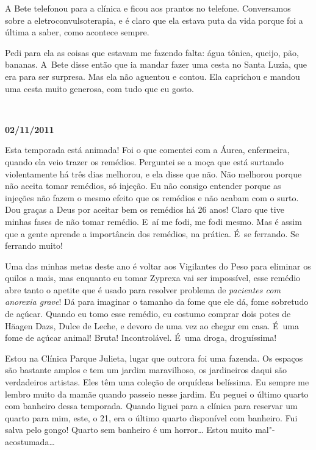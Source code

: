 A Bete telefonou para a clínica e ficou aos prantos no telefone.
Conversamos sobre a eletroconvulsoterapia, e é claro que ela estava puta
da vida porque foi a última a saber, como acontece sempre.

Pedi para ela as coisas que estavam me fazendo falta: água tônica,
queijo, pão, bananas. A~Bete disse então que ia mandar fazer uma
cesta no Santa Luzia, que era para ser surpresa. Mas ela não aguentou e
contou. Ela caprichou e mandou uma cesta muito generosa, com tudo que eu
gosto.

\begin{center}\asterisc{}​\end{center}


\begin{flushright}\textbf{02/11/2011}\end{flushright}


Esta temporada está animada! Foi o que comentei com a Áurea, enfermeira,
quando ela veio trazer os remédios. Perguntei se a moça que está
surtando violentamente há três dias melhorou, e ela disse que não. Não
melhorou porque não aceita tomar remédios, só injeção. Eu não consigo
entender porque as injeções não fazem o mesmo efeito que os remédios e
não acabam com o surto. Dou graças a Deus por aceitar bem os remédios há
26 anos! Claro que tive minhas fases de não tomar remédio. E~aí me fodi,
me fodi mesmo. Mas é assim que a gente aprende a importância dos
remédios, na prática. É~se ferrando. Se ferrando muito!

Uma das minhas metas deste ano é voltar aos Vigilantes do Peso para
eliminar os quilos a mais, mas enquanto eu tomar Zyprexa vai ser
impossível, esse remédio abre tanto o apetite que é usado para resolver
problema de \emph{pacientes com anorexia grave}!\textbf{} Dá para
imaginar o tamanho da fome que ele dá, fome sobretudo de açúcar. Quando
eu tomo esse remédio, eu costumo comprar dois potes de Häagen Dazs,
Dulce de Leche, e devoro de uma vez ao chegar em casa. É~uma fome de
açúcar animal! Bruta! Incontrolável. É~uma droga, droguíssima!

Estou na Clínica Parque Julieta, lugar que outrora foi uma fazenda. Os
espaços são bastante amplos e tem um jardim maravilhoso, os jardineiros
daqui são verdadeiros artistas. Eles têm uma coleção de orquídeas
belíssima. Eu sempre me lembro muito da mamãe quando passeio nesse jardim.
Eu peguei o último quarto com banheiro dessa temporada. Quando liguei
para a clínica para reservar um quarto para mim, este, o 21, era o
último quarto disponível com banheiro. Fui salva pelo gongo! Quarto sem
banheiro é um horror… Estou muito mal"-acostumada…

